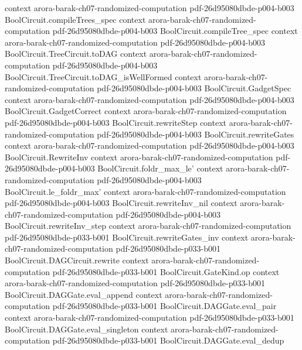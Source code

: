 \begin{theorem}
  {context}
  {arora-barak-ch07-randomized-computation}
  {pdf-26d95080dbde-p004-b003}
\proofstep
  {BoolCircuit.compileTrees_spec}
  {context}
  {arora-barak-ch07-randomized-computation}
  {pdf-26d95080dbde-p004-b003}
\proofstep
  {BoolCircuit.compileTree_spec}
  {context}
  {arora-barak-ch07-randomized-computation}
  {pdf-26d95080dbde-p004-b003}
\proofstep
  {BoolCircuit.TreeCircuit.toDAG}
  {context}
  {arora-barak-ch07-randomized-computation}
  {pdf-26d95080dbde-p004-b003}
\proofstep
  {BoolCircuit.TreeCircuit.toDAG_isWellFormed}
  {context}
  {arora-barak-ch07-randomized-computation}
  {pdf-26d95080dbde-p004-b003}
\proofstep
  {BoolCircuit.GadgetSpec}
  {context}
  {arora-barak-ch07-randomized-computation}
  {pdf-26d95080dbde-p004-b003}
\proofstep
  {BoolCircuit.GadgetCorrect}
  {context}
  {arora-barak-ch07-randomized-computation}
  {pdf-26d95080dbde-p004-b003}
\proofstep
  {BoolCircuit.rewriteStep}
  {context}
  {arora-barak-ch07-randomized-computation}
  {pdf-26d95080dbde-p004-b003}
\proofstep
  {BoolCircuit.rewriteGates}
  {context}
  {arora-barak-ch07-randomized-computation}
  {pdf-26d95080dbde-p004-b003}
\proofstep
  {BoolCircuit.RewriteInv}
  {context}
  {arora-barak-ch07-randomized-computation}
  {pdf-26d95080dbde-p004-b003}
\proofstep
  {BoolCircuit.foldr_max_le'}
  {context}
  {arora-barak-ch07-randomized-computation}
  {pdf-26d95080dbde-p004-b003}
\proofstep
  {BoolCircuit.le_foldr_max'}
  {context}
  {arora-barak-ch07-randomized-computation}
  {pdf-26d95080dbde-p004-b003}
\proofstep
  {BoolCircuit.rewriteInv_nil}
  {context}
  {arora-barak-ch07-randomized-computation}
  {pdf-26d95080dbde-p004-b003}
\proofstep
  {BoolCircuit.rewriteInv_step}
  {context}
  {arora-barak-ch07-randomized-computation}
  {pdf-26d95080dbde-p033-b001}
\proofstep
  {BoolCircuit.rewriteGates_inv}
  {context}
  {arora-barak-ch07-randomized-computation}
  {pdf-26d95080dbde-p033-b001}
\proofstep
  {BoolCircuit.DAGCircuit.rewrite}
  {context}
  {arora-barak-ch07-randomized-computation}
  {pdf-26d95080dbde-p033-b001}
\proofstep
  {BoolCircuit.GateKind.op}
  {context}
  {arora-barak-ch07-randomized-computation}
  {pdf-26d95080dbde-p033-b001}
\proofstep
  {BoolCircuit.DAGGate.eval_append}
  {context}
  {arora-barak-ch07-randomized-computation}
  {pdf-26d95080dbde-p033-b001}
\proofstep
  {BoolCircuit.DAGGate.eval_pair}
  {context}
  {arora-barak-ch07-randomized-computation}
  {pdf-26d95080dbde-p033-b001}
\proofstep
  {BoolCircuit.DAGGate.eval_singleton}
  {context}
  {arora-barak-ch07-randomized-computation}
  {pdf-26d95080dbde-p033-b001}
\proofstep
  {BoolCircuit.DAGGate.eval_dedup}

\end{theorem}
